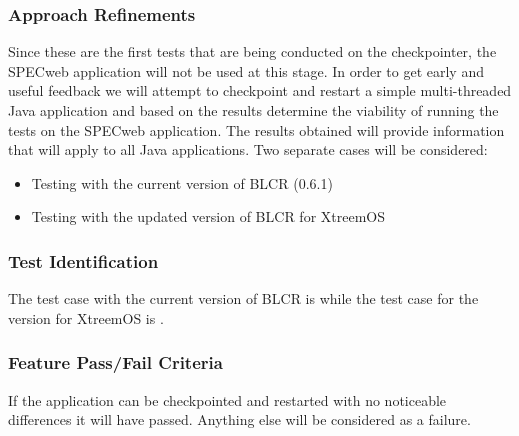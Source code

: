 \subsubsection{Approach Refinements}
Since these are the first tests that are being conducted on the checkpointer, the SPECweb application will not be used at this stage. In order to get early and useful feedback we will attempt to checkpoint and restart a simple multi-threaded Java application and based on the results determine the viability of running the tests on the SPECweb application. The results obtained will provide information that will apply to all Java applications.
Two separate cases will be considered:
\begin{itemize}
\item Testing with the current version of BLCR (0.6.1)
\item Testing with the updated version of BLCR for XtreemOS
\end{itemize}


\subsubsection{Test Identification}
The test case with the current version of BLCR is  while the test case for the version for XtreemOS is .



\subsubsection{Feature Pass/Fail Criteria}
If the application can be checkpointed and restarted with no noticeable differences it will have passed. Anything else will be considered as a failure.
